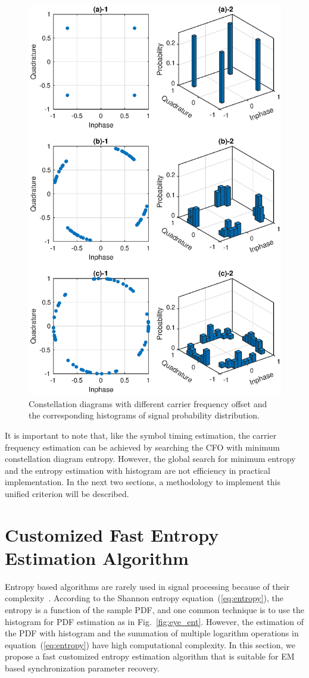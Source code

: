 \documentclass[journal,comsoc, onecolumn, 12pt,draftclsnofoot]{IEEEtran} %
\begin{document}
\begin{figure}[ht]
\centering
\includegraphics[width=3 in]{pic/const_hst.eps}
\caption{Constellation diagrams with different carrier frequency offset and the corresponding histograms of signal probability distribution.}
\label{fig:const_hst} 
\end{figure}

It is important to note that, like the symbol timing estimation, the carrier frequency estimation can be achieved by searching the CFO with minimum constellation diagram entropy.
However, the global search for minimum entropy and the entropy estimation with histogram are not efficiency in practical implementation.
In the next two sections, a methodology to implement this unified criterion will be described.

\section{Customized Fast Entropy Estimation Algorithm}
\label{sec:cust_entp}
Entropy based algorithms are rarely used in signal processing because of their complexity~\cite{Bercher2000}.
According to the Shannon entropy equation~(\ref{eq:entropy}), the entropy is a function of the sample PDF, and one common technique is to use the histogram for PDF estimation as in Fig.~\ref{fig:eye_ent}.
However, the estimation of the PDF with histogram and the summation of multiple logarithm operations  in equation~(\ref{eq:entropy}) have high computational complexity.
In this section, we propose a fast customized entropy estimation algorithm that is suitable for EM based synchronization parameter recovery. 
\end{document}
